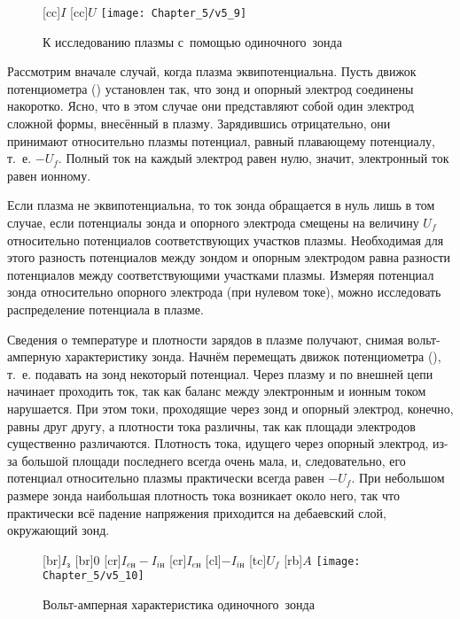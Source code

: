 \begin{figure}
	[cc]{$I$}
	[cc]{$U$}
	\texttt{[image: Chapter\_5/v5\_9]}
	\caption{К исследованию плазмы с~помощью одиночного~зонда}
	\figmark[9]
\end{figure}

Рассмотрим вначале случай, когда плазма эквипотенциальна. Пусть движок потенциометра () установлен так, что зонд и
опорный электрод соединены накоротко. Ясно, что в этом случае они представляют собой один электрод сложной формы,
внесённый в плазму. Зарядившись отрицательно, они принимают относительно плазмы потенциал, равный плавающему потенциалу,
т.~е. $-U_f$. Полный ток на каждый электрод равен нулю, значит, электронный ток равен ионному.

Если плазма не эквипотенциальна, то ток зонда обращается в нуль лишь в том случае, если потенциалы зонда и опорного
электрода смещены на величину $U_f$ относительно потенциалов соответствующих участков плазмы. Необходимая для этого
разность потенциалов между зондом и опорным электродом равна разности потенциалов между соответствующими участками
плазмы. Измеряя потенциал зонда относительно опорного электрода (при нулевом токе), можно исследовать распределение
потенциала в плазме.

Сведения о температуре и плотности зарядов в плазме получают, снимая вольт-амперную характеристику зонда. Начнём
перемещать движок потенциометра (), т.~е. подавать на зонд некоторый потенциал. Через плазму и по внешней цепи
начинает проходить ток, так как баланс между электронным и ионным током нарушается. При этом
токи, проходящие через зонд и опорный электрод, конечно, равны друг другу, а плотности тока различны, так как площади
электродов существенно различаются. Плотность тока, идущего через опорный электрод, из-за большой площади последнего
всегда очень мала, и, следовательно, его потенциал относительно плазмы практически всегда равен $-U_f$. При небольшом
размере зонда наибольшая плотность тока возникает около него, так что практически всё падение напряжения приходится на
дебаевский слой, окружающий зонд.

\begin{wrapfigure}{o}{0.5\textwidth}
	[br]{$I_з$}
	[br]{0}
	[cr]{$I_{eн}-I_{iн}$}
	[cr]{$I_{eн}$}
	[cl]{$-I_{iн}$}
	[tc]{$U_f$}
	[rb]{$A$}
	\texttt{[image: Chapter\_5/v5\_10]}
	\caption{Вольт-амперная характеристика одиночного~зонда}
	\figmark[10]
\end{wrapfigure}


